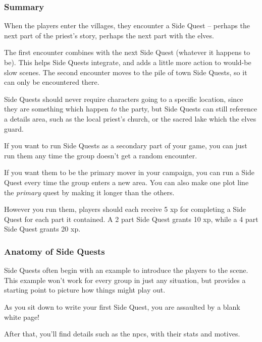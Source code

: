 \begin{multicols}{2}
\subsubsection{Summary}

When the players enter the villages, they encounter a Side Quest -- perhaps the next part of the priest's story, perhaps the next part with the elves.

The first encounter combines with the next Side Quest (whatever it happens to be).
This helps Side Quests integrate, and adds a little more action to would-be slow scenes.
The second encounter moves to the pile of town Side Quests, so it can only be encountered there.

Side Quests should never require characters going to a specific location, since they are something which happen \emph{to} the party, but Side Quests can still reference a details area, such as the local priest's church, or the sacred lake which the elves guard.

If you want to run Side Quests as a secondary part of your game, you can just run them any time the group doesn't get a random encounter.

If you want them to be the primary mover in your campaign, you can run a Side Quest every time the group enters a new area.
You can also make one plot line the \emph{primary} quest by making it longer than the others.

However you run them, players should each receive 5 \gls{xp} for completing a Side Quest for each part it contained.  A 2 part Side Quest grants 10 \gls{xp}, while a 4 part Side Quest grants 20 \gls{xp}.

\subsubsection{Anatomy of Side Quests}

Side Quests often begin with an example to introduce the players to the scene.
This example won't work for every group in just any situation, but provides a starting point to picture how things might play out.

\begin{boxtext}

	As you sit down to write your first Side Quest, you are assaulted by a blank white page!

\end{boxtext}

After that, you'll find details such as the \glspl{npc}, with their stats and motives.


\end{multicols}
